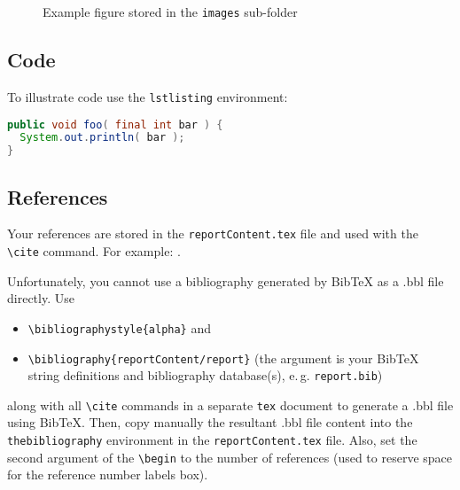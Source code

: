 \begin{figure}[tb]
\centering
    \qquad
\caption{Example figure stored in the \texttt{images} sub-folder}
\label{fig:example subfigure}
\end{figure}


\subsection*{Code}
To illustrate code use the \texttt{lstlisting} environment:
\begin{lstlisting}[language=Java]
public void foo( final int bar ) {
  System.out.println( bar );
}
\end{lstlisting}


\subsection*{References}
Your references are stored in the \texttt{reportContent.tex} file and used with the \texttt{\textbackslash cite} command. For example: \cite{IEEEhowto:kopka}.

Unfortunately, you cannot use a bibliography generated by BibTeX as a .bbl file directly. Use \begin{itemize} 
\item \texttt{\textbackslash bibliographystyle\{alpha\}} and 
\item \texttt{\textbackslash bibliography\{reportContent/report\}} (the argument is your BibTeX\\ string definitions and bibliography database(s), e.\,g. \texttt{report.bib}) 
\end{itemize} along with all \texttt{\textbackslash cite} commands in a separate \texttt{tex} document to generate a .bbl file using BibTeX. Then, copy manually the resultant .bbl file content into the \texttt{thebibliography} environment in the \texttt{reportContent.tex} file. Also, set the second argument of the \texttt{\textbackslash begin} to the number of references (used to reserve space for the reference number labels box).

\pagebreak